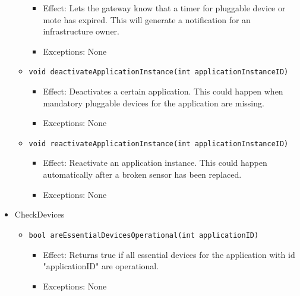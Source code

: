 \begin{itemize}
\begin{itemize}
\begin{itemize}
                \item Effect: Lets the gateway know that a timer for pluggable device or mote has expired.
                              This will generate a notification for an infrastructure owner.
                \item Exceptions: None
            \end{itemize}
            \item \texttt{void deactivateApplicationInstance(int applicationInstanceID)}
            \begin{itemize}
                \item Effect: Deactivates a certain application. This could happen when
                              mandatory pluggable devices for the application are missing.
                \item Exceptions: None
            \end{itemize}
            \item \texttt{void reactivateApplicationInstance(int applicationInstanceID)}
            \begin{itemize}
                \item Effect: Reactivate an application instance. This could happen
                              automatically after a broken sensor has been replaced.
                \item Exceptions: None
            \end{itemize}
        \end{itemize}
        \item CheckDevices
        \begin{itemize}
            \item \texttt{bool areEssentialDevicesOperational(int applicationID)}
            \begin{itemize}
                \item Effect: Returns true if all essential devices for the application
                              with id "applicationID" are operational.
                \item Exceptions: None
            \end{itemize}
        \end{itemize}
    \end{itemize}

